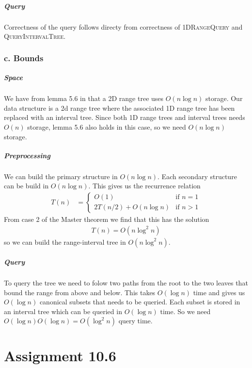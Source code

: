 \documentclass[10pt,a4paper,final,oneside,openany,article,oldfontcommands]{memoir}
\newcommand{\twopartdef}[4] {
  \left\{
    \begin{array}{ll}
      #1 & \mbox{if } #2 \\
      {#3} & \mbox{if } #4
    \end{array}
  \right.
}
\begin{document}
\paragraph{Query}
Correctness of the query follows directy from correctness of \textsc{ 1DRangeQuery} and \textsc{ QueryIntervalTree}.


\subsection*{c. Bounds}
\paragraph{Space}We have from lemma 5.6 in \cite{deBerg} that a 2D range tree uses $O(n \log n)$ storage. Our data structure is a 2d range tree where the associated 1D range tree has been replaced with an interval tree. Since both 1D range trees and interval trees needs $O(n)$ storage, lemma 5.6 also holds in this case, so we need $O(n \log n)$ storage.

\paragraph{Preprocessing}
We can build the primary structure in $O(n \log n)$. Each secondary structure can be build in $O(n \log n)$. This gives us the recurrence relation
\begin{align*}
  T(n) &= \twopartdef{O(1)}{n = 1}{2T(n/2) + O(n \log n)}{n > 1}
\end{align*}
From case 2 of the Master theorem we find that this has the solution
\begin{align*}
  T(n) = O(n \log^2 n)
\end{align*}
so we can build the range-interval tree in $O(n \log^2 n)$.

\paragraph{Query}
To query the tree we need to folow two paths from the root to the two leaves that bound the range from above and below. This takes $O(\log n)$ time and gives us $O(\log n)$ canonical subsets that needs to be queried. Each subset is stored in an interval tree which can be queried in $O(\log n)$ time. So we need $O(\log n)O(\log n) = O(\log^2 n)$ query time.




\chapter*{Assignment 10.6}
\end{document}
